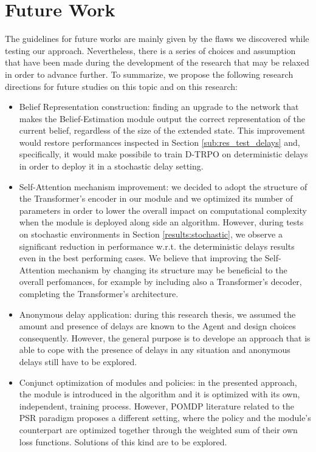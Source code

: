     \section{Future Work}
    \label{conc:future}
        The guidelines for future works are mainly given by the flaws we discovered while testing our approach. Nevertheless, there is a series of choices and assumption that have been made during the development of the research that may be relaxed in order to advance further. To summarize, we propose the following research directions for future studies on this topic and on this research:
        \begin{itemize}
            \item Belief Representation construction: finding an upgrade to the network that makes the Belief-Estimation module output the correct representation of the current belief, regardless of the size of the extended state. This improvement would restore performances inspected in Section \ref{sub:res_test_delays} and, specifically, it would make possibile to train D-TRPO on deterministic delays in order to deploy it in a stochastic delay setting.
            \item Self-Attention mechanism improvement: we decided to adopt the structure of the Transformer's encoder in our module and we optimized its number of parameters in order to lower the overall impact on computational complexity when the module is deployed along side an algorithm. However, during tests on stochastic environments in Section \ref{results:stochastic}, we observe a significant reduction in performance w.r.t. the deterministic delays results even in the best performing cases. We believe that improving the Self-Attention mechanism by changing its structure may be beneficial to the overall perfomances, for example by including also a Transformer's decoder, completing the Transformer's architecture.
            \item Anonymous delay application: during this research thesis, we assumed the amount and presence of delays are known to the Agent and design choices consequently. However, the general purpose is to develope an approach that is able to cope with the presence of delays in any situation and anonymous delays still have to be explored.
            \item Conjunct optimization of modules and policies: in the presented approach, the module is introduced in the algorithm and it is optimized with its own, independent, training process. However, POMDP literature related to the PSR paradigm proposes a different setting, where the policy and the module's counterpart are optimized together through the weighted sum of their own loss functions. Solutions of this kind are to be explored.
        \end{itemize}